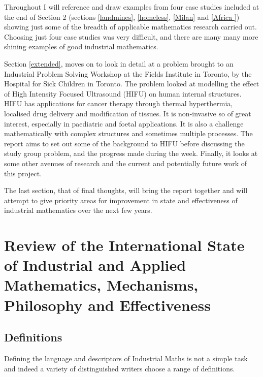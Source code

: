 \documentclass[11pt]{article} %
\begin{document}
	Throughout I will reference and draw examples from four case studies included at the end of Section 2 (sections \ref{landmines}, \ref{homeless}, \ref{Milan} and \ref{Africa }) showing just some of the breadth of applicable mathematics research carried out. Choosing just four case studies was very difficult, and there are many many more shining examples of good industrial mathematics. 
	
	Section \ref{extended}, moves on to look in detail at a problem brought to an Industrial Problem Solving Workshop at the Fields Institute in Toronto, by the Hospital for Sick Children in Toronto. The problem looked at modelling the effect of High Intensity Focused Ultrasound (HIFU) on human internal structures. HIFU has applications for cancer therapy through thermal hyperthermia, localised drug delivery and modification of tissues. It is non-invasive so of great interest, especially in paediatric and foetal applications. It is also a challenge mathematically with complex structures and sometimes multiple processes. The report aims to set out some of the background to HIFU before discussing the study group problem, and the progress made during the week. Finally, it looks at some other avenues of research and the current and potentially future work of this project. 
	
	The last section, that of final thoughts, will bring the report together and will attempt to give priority areas for improvement in state and effectiveness of industrial mathematics over the next few years. 
	
	\pagebreak
	\section{Review of the International State of Industrial and Applied Mathematics, Mechanisms, Philosophy and Effectiveness}
	

	
	\subsection{Definitions \label{definitions} }
	
	Defining the language and descriptors of  Industrial Maths is not a simple task and indeed a variety of distinguished writers choose a range of definitions. 
	
\end{document}
